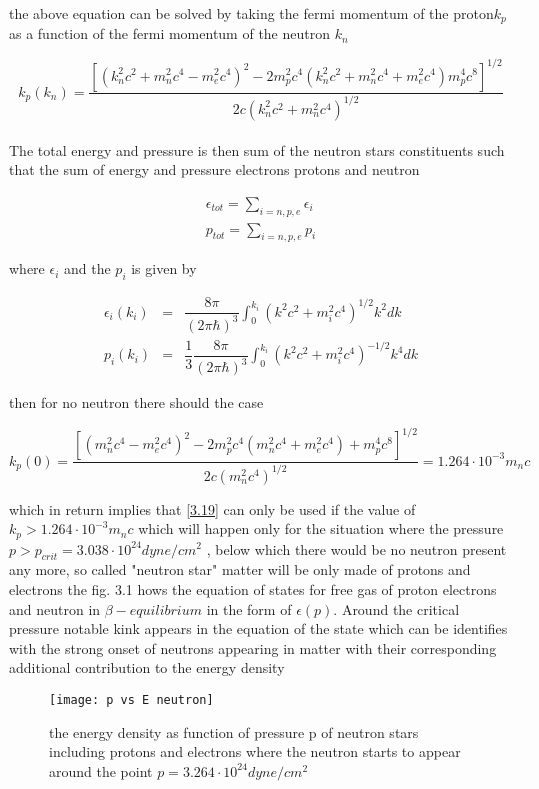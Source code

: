 \documentclass{report}
\begin{document}
the above equation can be solved by taking the fermi momentum of the proton$k_p$ as a function of the fermi momentum of the  neutron $k_n$
\begin{center}
\begin{equation}
k_p(k_n) = \dfrac{\left[(k_n^2c^2 +m_n^2c^4 - m_e^2c^4)^2 - 2m_p^2c^4(k_n^2c^2+m_n^2c^4 +m_e^2c^4) m_p^4c^8 \right]^{1/2}}{2c(k_n^2c^2 + m_n^2c^4)^{1/2}}
\label{3.19}
\end{equation}
\end{center}
\newpage
\paragraph{ }
The total energy and pressure is then sum of the neutron stars constituents such that the sum of energy and pressure electrons protons and neutron 
\begin{center}
\begin{eqnarray}
\epsilon_{tot} = \sum _{i=n,p,e} \epsilon_i \\
\label{3.20}
p_{tot} = \sum_{i=n,p,e} p_i 
\label{3.21}
\end{eqnarray}
\end{center}
where $\epsilon_i $ and the $p_i$ is given by 
\begin{center}
\begin{eqnarray} 
\epsilon_i(k_i) &=& \dfrac{8\pi}{(2\pi \hbar)^3}\int _0  ^ {k_i}(k^2c^2+m_i^2 c^4)^{1/2}k^2 dk \\
\label{3.22}
p_i(k_i) &=& \dfrac{1}{3}\dfrac{8\pi}{(2\pi \hbar)^3}\int_0  ^{k_i}(k^2c^2+m_i^2 c^4)^{-1/2}k^4 dk 
\label{3.23}
\end{eqnarray}
\end{center}
then for no neutron there should the case 
\begin{center}
\begin{equation}
k_p(0) = \dfrac{\left[( m_n^2c^4 - m_e^2c^4)^2 - 2m_p^2c^4(m_n^2c^4 +m_e^2c^4) +m_p^4c^8 \right]^{1/2}}{2c( m_n^2c^4)^{1/2}}=1.264\cdot 10^{-3}m_nc
\label{3.24}
\end{equation}
\end{center}
which in return implies that \ref{3.19} can only be used if the value of $k_p>1.264\cdot 10^{-3}m_nc$ which will happen only for the situation where the pressure $p>p_{crit}=3.038\cdot 10^{24}dyne/cm^2$ , below which there would be no neutron  present any more, so called "neutron star" matter will be only made of protons and electrons the fig. 3.1  hows the equation of states for free gas of proton electrons and neutron in $\beta-equilibrium $ in the form of $\epsilon(p)$. Around the critical pressure  notable kink appears in the equation of the state which can be identifies with the strong onset of neutrons appearing in matter with their corresponding additional contribution to the energy density
\begin{center}
\begin{figure}
\texttt{[image: p vs E neutron]}
\caption{the energy density as function of pressure p of neutron stars including protons and electrons where the neutron starts to appear around the point $p=3.264\cdot 10^{24} dyne/cm^2$}
\end{figure}
\end{center}
\end{document}
